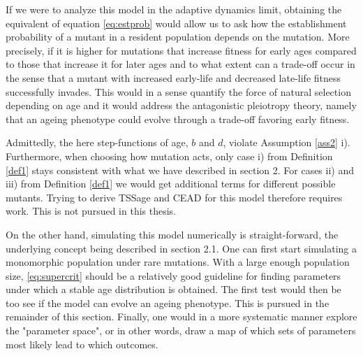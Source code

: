 \documentclass[11pt, a4paper]{article}
\theoremstyle{definition}
\begin{document}
    If we were to analyze this model in the adaptive dynamics limit, obtaining the equivalent of equation \eqref{eq:estprob} would allow us to ask how the establishment probability of a mutant in a resident population depends on the mutation. More precisely, if it is higher for mutations that increase fitness for early ages compared to those that increase it for later ages and to what extent can a trade-off occur in the sense that a mutant with increased early-life and decreased late-life fitness successfully invades.
    This would in a sense quantify the force of natural selection depending on age and it would address the antagonistic pleiotropy theory, namely that an ageing phenotype could evolve through a trade-off favoring early fitness.

    Admittedly, the here step-functions of age, $b$ and $d$, violate Assumption \ref{ass2} i). Furthermore, when choosing how mutation acts, only case i) from Definition \ref{def1} stays consistent with what we have described in section 2. For cases ii) and iii) from Definition \ref{def1} we would get additional terms for different possible mutants. Trying to derive TSSage and CEAD for this model therefore requires work. This is not pursued in this thesis.

    On the other hand, simulating this model numerically is straight-forward, the underlying concept being described in section 2.1. One can first start simulating a monomorphic population under rare mutations. With a large enough population size, \eqref{eq:supercrit} should be a relatively good guideline for finding parameters under which a stable age distribution is obtained. The first test would then be too see if the model can evolve an ageing phenotype. This is pursued in the remainder of this section. Finally, one would in a more systematic manner explore the "parameter space", or in other words, draw a map of which sets of parameters most likely lead to which outcomes.

    
\end{document}
